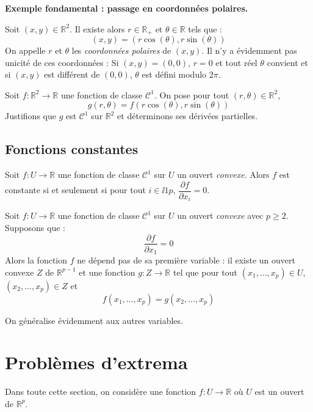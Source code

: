 \documentclass[french,11pt,twoside]{VcCours}
\begin{document}
\textbf{Exemple fondamental : passage en coordonnées polaires.}

Soit $(x,y) \in \mathbb{R}^2$. Il existe alors $r \in \mathbb{R}_+$ et $\theta \in \mathbb{R}$ tels que :
$$ (x,y) = (r \cos(\theta), r \sin(\theta))$$
On appelle $r$ et $\theta$ les \emph{coordonnées polaires} de $(x,y)$. Il n'y a évidemment pas unicité de ces coordonnées : Si $(x,y)=(0,0)$, $r=0$ et tout réel $\theta$ convient et si $(x,y)$ est différent de $(0,0)$, $\theta$ est \og défini \fg modulo $2\pi$. 

\medskip

Soit $f : \mathbb{R}^2 \rightarrow \mathbb{R}$ une fonction de classe $\mathcal{C}^1$. On pose pour tout $(r, \theta) \in \mathbb{R}^2$,
$$ g(r, \theta)= f(r \cos(\theta), r \sin(\theta))$$
Justifions que $g$ est $\mathcal{C}^1$ sur $\mathbb{R}^2$ et déterminons ses dérivées partielles.

\vspace{7cm}

\newpage

\subsection{Fonctions constantes}

\begin{Proposition}{} Soit $f : U \rightarrow \mathbb{R}$ une fonction de classe $\mathcal{C}^1$ sur $U$ un ouvert \emph{convexe}. Alors $f$ est constante si et seulement si pour tout $i \in \ii{1}{p}$, $\dfrac{\partial f}{\partial x_i}=0$.
\end{Proposition}

\begin{Proposition}{} Soit $f : U \rightarrow \mathbb{R}$ une fonction de classe $\mathcal{C}^1$ sur $U$ un ouvert \emph{convexe} avec $p \geq 2$. Supposons que :
$$ \dfrac{\partial f }{\partial x_1} = 0$$
Alors la fonction $f$ ne \og dépend pas \fg{} de sa première variable : il existe un ouvert convexe $Z$ de $\mathbb{R}^{p-1}$ et une fonction $g : Z \rightarrow \mathbb{R}$ tel que pour tout $(x_1, \ldots, x_p) \in U$, $(x_2, \ldots,x_p) \in Z$ et 
$$f(x_1, \ldots, x_p) = g(x_2, \ldots, x_p) $$
\end{Proposition}

\begin{Remarque}{} On généralise évidemment aux autres variables.
\end{Remarque}

\section{Problèmes d'extrema}
Dans toute cette section, on considère une fonction $f : U \rightarrow \mathbb{R}$ où $U$ est un ouvert de $\mathbb{R}^p$.
\end{document}
